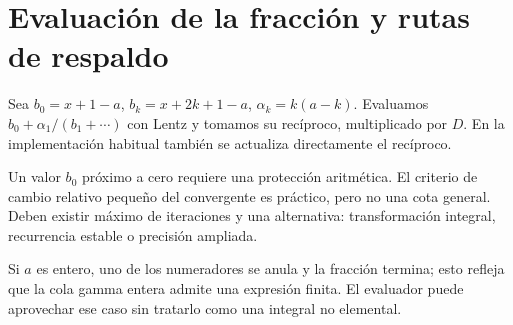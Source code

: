 \documentclass[11pt,a4paper]{article}
\theoremstyle{definition}
\begin{document}
\section{Evaluación de la fracción y rutas de respaldo}
Sea $b_0=x+1-a$, $b_k=x+2k+1-a$, $\alpha_k=k(a-k)$. Evaluamos
$b_0+\alpha_1/(b_1+\cdots)$ con Lentz y tomamos su recíproco, multiplicado por $D$. En la implementación habitual también se actualiza directamente el recíproco.

Un valor $b_0$ próximo a cero requiere una protección aritmética. El criterio de cambio relativo pequeño del convergente es práctico, pero no una cota general. Deben existir máximo de iteraciones y una alternativa: transformación integral, recurrencia estable o precisión ampliada.

Si $a$ es entero, uno de los numeradores se anula y la fracción termina; esto refleja que la cola gamma entera admite una expresión finita. El evaluador puede aprovechar ese caso sin tratarlo como una integral no elemental.
\end{document}
